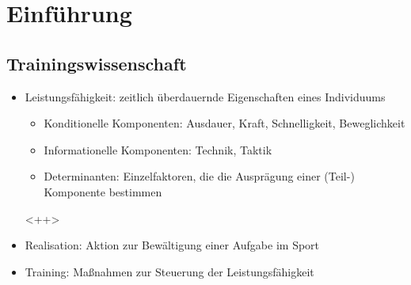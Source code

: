 
\section{Einführung}

\subsection{Trainingswissenschaft}
\begin{itemize}

\item Leistungsfähigkeit: zeitlich überdauernde Eigenschaften eines Individuums
  \begin{itemize}
  \item Konditionelle Komponenten: Ausdauer, Kraft, Schnelligkeit, Beweglichkeit
  \item Informationelle Komponenten: Technik, Taktik
  \item Determinanten: Einzelfaktoren, die die Ausprägung einer (Teil-) Komponente bestimmen
  \end{itemize}<++>
\item Realisation: Aktion zur Bewältigung einer Aufgabe im Sport
\item Training: Maßnahmen zur Steuerung der Leistungsfähigkeit
  \begin{itemize}
    

\end{itemize}
\end{itemize}
